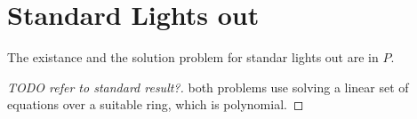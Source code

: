 \section{Standard Lights out}
\begin{theorem}\label{standard-complexity}
    The existance and the solution problem for standar lights out are in $P$. 
\end{theorem}

\begin{proof}[TODO refer to standard result?]
    both problems use solving a linear set of equations over a suitable ring, which is polynomial.
\end{proof}
